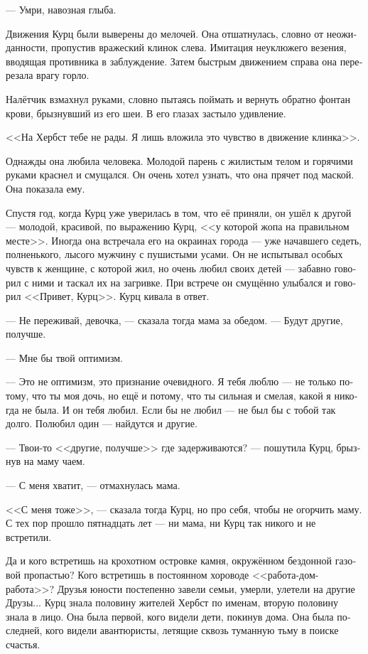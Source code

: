 \documentclass[a4paper,10pt,fleqn]{book}\usepackage{polyglossia}\setdefaultlanguage[babelshorthands=true]{russian}\setotherlanguage{english}\defaultfontfeatures{Ligatures=TeX,Mapping=tex-text}\usepackage{xcolor}\newcommand{\ml}[3]{#2}
\newcommand{\asterism}{\vspace{1em}{\centering\Large\bfseries$\ast~\ast~\ast$\par}\vspace{1em}}
\begin{document}
--- Умри, навозная глыба.

Движения Курц были выверены до мелочей.
Она отшатнулась, словно от неожиданности, пропустив вражеский клинок слева.
Имитация неуклюжего везения, вводящая противника в заблуждение.
Затем быстрым движением справа она перерезала врагу горло.

Налётчик взмахнул руками, словно пытаясь поймать и вернуть обратно фонтан крови, брызнувший из его шеи.
В его глазах застыло удивление.

<<На Хербст тебе не рады.
Я лишь вложила это чувство в движение клинка>>.

\asterism

Однажды она любила человека.
Молодой парень с жилистым телом и горячими руками краснел и смущался.
Он очень хотел узнать, что она прячет под маской.
Она показала ему.

Спустя год, когда Курц уже уверилась в том, что её приняли, он ушёл к другой --- молодой, красивой, по выражению Курц, <<у которой жопа на правильном месте>>.
Иногда она встречала его на окраинах города --- уже начавшего седеть, полненького, лысого мужчину с пушистыми усами.
Он не испытывал особых чувств к женщине, с которой жил, но очень любил своих детей --- забавно говорил с ними и таскал их на загривке.
При встрече он смущённо улыбался и говорил <<Привет, Курц>>.
Курц кивала в ответ.

--- Не переживай, девочка, --- сказала тогда мама за обедом.
--- Будут другие, получше.

--- Мне бы твой оптимизм.

--- Это не оптимизм, это признание очевидного.
Я тебя люблю --- не только потому, что ты моя дочь, но ещё и потому, что ты сильная и смелая, какой я никогда не была.
И он тебя любил.
Если бы не любил --- не был бы с тобой так долго.
Полюбил один --- найдутся и другие.

--- Твои-то <<другие, получше>> где задерживаются? --- пошутила Курц, брызнув на маму чаем.

--- С меня хватит, --- отмахнулась мама.

<<С меня тоже>>, --- сказала тогда Курц, но про себя, чтобы не огорчить маму.
С тех пор прошло пятнадцать лет --- ни мама, ни Курц так никого и не встретили.

Да и кого встретишь на крохотном островке камня, окружённом бездонной газовой пропастью?
Кого встретишь в постоянном хороводе <<работа-дом-работа>>?
Друзья юности постепенно завели семьи, умерли, улетели на другие Друзы...
Курц знала половину жителей Хербст по именам, вторую половину знала в лицо.
Она была первой, кого видели дети, покинув дома.
Она была последней, кого видели авантюристы, летящие сквозь туманную тьму в поиске счастья.
\end{document}
